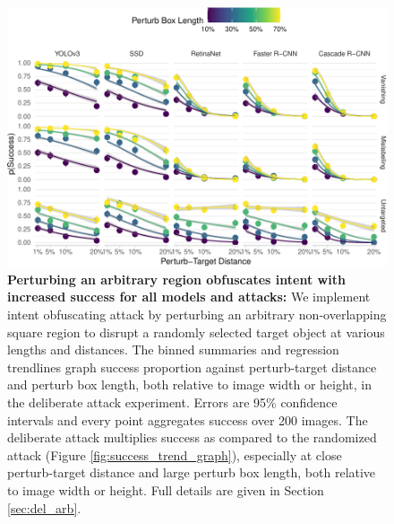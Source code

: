 \documentclass[
]{article}
\begin{document}
\begin{figure}[tb]

{\centering \includegraphics[width=1\linewidth]{rmd_imgs/arbitrary_trend_graph-1} 

}

\caption{\textbf{Perturbing an arbitrary region obfuscates intent with increased success for all models and attacks:}  We implement intent obfuscating attack by perturbing an arbitrary non-overlapping square region to disrupt a randomly selected target object at various lengths and distances. The binned summaries and regression trendlines graph success proportion against perturb-target distance and perturb box length, both relative to image width or height, in the deliberate attack experiment. Errors are 95\% confidence intervals and every point aggregates success over 200 images. The deliberate attack multiplies success as compared to the randomized attack (Figure \ref{fig:success_trend_graph}), especially at close perturb-target distance and large perturb box length, both relative to image width or height. Full details are given in Section \ref{sec:del_arb}.}\label{fig:arbitrary_trend_graph}
\end{figure}

\begingroup\fontsize{9}{11}\selectfont
\end{document}

